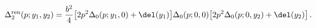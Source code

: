 \begin{equation}
\Delta_2^\mathrm{ren}(p;y_1,y_2)=
\frac{b^2}{4} \big[2p^2 \Delta_0(p;y_1,0)+\del(y_1)\big]
\Delta_0(p;0,0) \big[2p^2 \Delta_0(p;0,y_2)+\del(y_2)\big] \, .
\end{equation}

